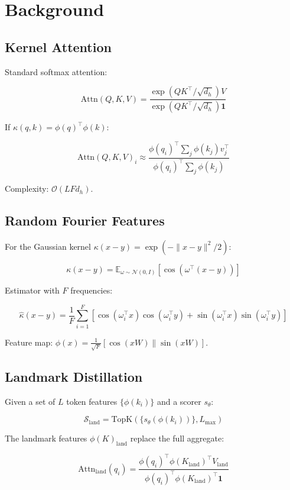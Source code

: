 \section{Background}

\subsection{Kernel Attention}

Standard softmax attention:

\[
\text{Attn}(Q, K, V) = \frac{\exp(QK^\top / \sqrt{d_h}) V}{\exp(QK^\top / \sqrt{d_h}) \mathbf{1}}
\tag{3.1}
\]

If $\kappa(q, k) = \phi(q)^\top \phi(k)$:

\[
\text{Attn}(Q, K, V)_i \approx \frac{\phi(q_i)^\top \sum_j \phi(k_j) v_j^\top}{\phi(q_i)^\top \sum_j \phi(k_j)}
\tag{3.2}
\]

Complexity: $\mathcal{O}(L F d_h)$.

\subsection{Random Fourier Features}

For the Gaussian kernel $\kappa(x - y) = \exp(-\|x - y\|^2 / 2)$:

\[
\kappa(x - y) = \mathbb{E}_{\omega \sim \mathcal{N}(0, I)}[\cos(\omega^\top (x - y))]
\tag{3.3}
\]

Estimator with $F$ frequencies:

\[
\hat{\kappa}(x - y) = \frac{1}{F} \sum_{i=1}^F [\cos(\omega_i^\top x)\cos(\omega_i^\top y) + \sin(\omega_i^\top x)\sin(\omega_i^\top y)]
\tag{3.4}
\]

Feature map: $\phi(x) = \frac{1}{\sqrt{F}} [\cos(xW) \| \sin(xW)]$.

\subsection{Landmark Distillation}

Given a set of $L$ token features $\{\phi(k_i)\}$ and a scorer $s_\theta$:

\[
\mathcal{S}_\text{land} = \text{TopK}(\{s_\theta(\phi(k_i))\}, L_\text{max})
\tag{3.5}
\]

The landmark features $\phi(K)_\text{land}$ replace the full aggregate:

\[
\text{Attn}_\text{land}(q_i) = \frac{\phi(q_i)^\top \phi(K_\text{land})^\top V_\text{land}}{\phi(q_i)^\top \phi(K_\text{land})^\top \mathbf{1}}
\tag{3.6}
\]

